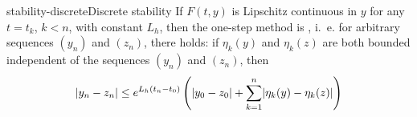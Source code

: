 \begin{Theorem*}{stability-discrete}{Discrete stability}
  If $F(t,y)$ is Lipschitz continuous in $y$ for any $t=t_k$, $k<n$,
  with constant $L_h$, then the one-step method is , i.~e. for arbitrary sequences $(y_n)$ and $(z_n)$, there
  holds: if $\eta_k(y)$ and $\eta_k(z)$ are both bounded independent
  of the sequences $(y_n)$ and $(z_n)$, then
  \begin{equation*}
    \lvert y_n - z_n\rvert
    \le e^{L_h(t_n-t_0)} \left(
      \lvert y_0 - z_0\rvert
      + \sum_{k=1}^n \lvert\eta_k(y) - \eta_k(z)\rvert
    \right)
  \end{equation*}
\end{Theorem*}

